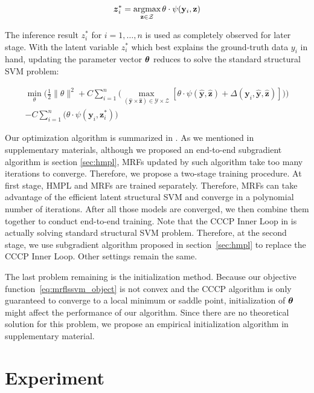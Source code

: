 \documentclass[sigconf,anonymous,review]{acmart}
\renewcommand{\cite}{\citep}
\begin{document}
\begin{align}
  {\boldsymbol{z}}_i^*=\mathop{\textrm{argmax}}_{\mathbf{z} \in \mathcal{Z}} \theta \cdot
  \psi(\mathbf{y}_i,\mathbf{z})
\end{align}

The inference result $z_i^*$ for $i=1,\dots,n$ is used as
completely observed for later stage. With the latent variable
$z_i^*$ which best explains the ground-truth data $y_i$ in hand,
updating the parameter vector $\boldsymbol{\theta}$ reduces to solve the
standard structural SVM problem:

\begin{align}
\label{eq:mrflssvm_object}
  \min_\theta\bigg(\frac{1}{2}\|\theta\|^2+
  C\sum_{i=1}^{n}\big(\max_{(\mathbf{\hat{y}} \times
  \mathbf{\hat{z}}) \in \mathcal{Y} \times \mathcal{Z}}
  [\theta\cdot\psi(\mathbf{\hat{y}},\mathbf{\hat{z}}) +
  \Delta(\mathbf{y}_i,\mathbf{\hat{y}},\mathbf{\hat{z}})]\big)\bigg)\\
  -C\sum_{i=1}^{n}\big(\theta \cdot
  \psi(\mathbf{y}_i,\mathbf{z}_i^*)\big) \nonumber
\end{align}

Our optimization algorithm is summarized in
. As we mentioned in supplementary materials, 
although we proposed an end-to-end
subgradient algorithm is section \ref{sec:hmpl}, MRFs updated by
such algorithm take too many iterations to converge. Therefore,
we propose a two-stage training procedure. At first stage, HMPL
and MRFs are trained separately. Therefore, MRFs can take
advantage of the efficient latent structural SVM and converge in
a polynomial number of iterations. After all those models are
converged, we then combine them together to conduct end-to-end
training. Note that the CCCP Inner Loop in 
is actually solving standard structural SVM problem. Therefore,
at the second stage, we use subgradient algorithm proposed in
section~\ref{sec:hmpl} to replace the CCCP Inner Loop. Other
settings remain the same.

The last problem remaining is the initialization method. Because
our objective function~\eqref{eq:mrflssvm_object} is not convex
and the CCCP algorithm is only guaranteed to converge to a local
minimum or saddle point\cite{yuille2002concave}, initialization
of $\boldsymbol{\theta}$ might affect the performance of our algorithm. Since
there are no theoretical solution for this problem, we propose an
empirical initialization algorithm in supplementary material.


\section{Experiment}
\label{sec:exp}
\end{document}
